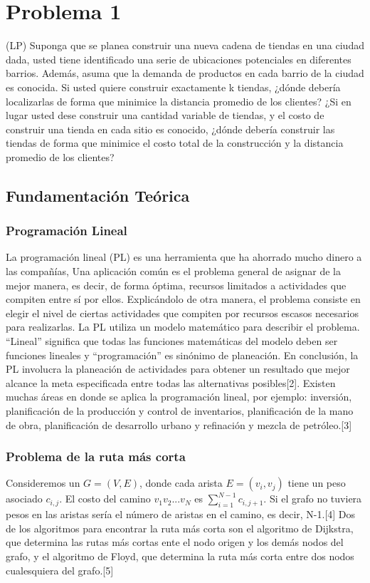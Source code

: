 \documentclass[conference,compsoc]{IEEEtran}
\begin{document}
\section{Problema 1}
(LP) Suponga que se planea construir una nueva cadena de tiendas en una ciudad dada, usted tiene identificado una serie de ubicaciones potenciales en diferentes barrios. Además, asuma que la demanda de productos en cada barrio de la ciudad es conocida. Si usted quiere construir exactamente k tiendas, ¿dónde debería localizarlas de forma que minimice la distancia promedio de los clientes? ¿Si en lugar usted dese construir una cantidad variable de tiendas, y el costo de construir una tienda en cada sitio es conocido, ¿dónde debería construir las tiendas de forma que minimice el costo total de la construcción y la distancia promedio de los clientes?


\subsection{Fundamentación Teórica}
\subsubsection{Programación Lineal}

La programación lineal (PL) es una herramienta que ha ahorrado mucho dinero a las compañías, Una aplicación común es el problema general de asignar de la mejor manera, es decir, de forma óptima, recursos limitados a actividades que compiten entre sí por ellos. Explicándolo de otra manera, el problema consiste en elegir el nivel de ciertas actividades que compiten por recursos escasos necesarios para realizarlas. La PL utiliza un modelo matemático para describir el problema. “Lineal” significa que todas las funciones matemáticas del modelo deben ser funciones lineales y “programación” es sinónimo de planeación. En conclusión, la PL involucra la planeación de actividades para obtener un resultado que mejor alcance la meta especificada entre todas las alternativas posibles[2]. Existen muchas áreas en donde se aplica la programación lineal, por ejemplo: inversión, planificación de la producción y control de inventarios, planificación de la mano de obra, planificación de desarrollo urbano y refinación y mezcla de petróleo.[3]


\subsubsection{Problema de la ruta más corta}
Consideremos un $G=(V,E)$, donde cada arista $E=(v_{i}, v_{j})$ tiene un peso asociado $c_{i,j}$. El costo del camino $v_{1} v_{2} ... v_{N}$ es $\sum_{i=1}^{N-1} c_{i,j+1}$. Si el grafo no tuviera pesos en las aristas sería el número de aristas en el camino, es decir, N-1.[4]
Dos de los algoritmos para encontrar la ruta más corta son el algoritmo de Dijkstra, que determina las rutas más cortas ente el nodo origen y los demás nodos del grafo, y el algoritmo de Floyd, que determina la ruta más corta entre dos nodos cualesquiera del grafo.[5]
\end{document}
